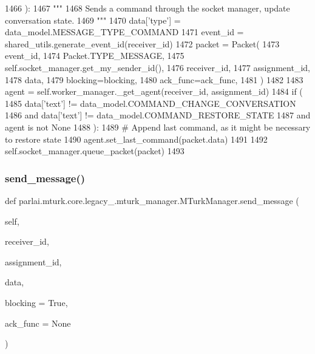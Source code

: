 \begin{DoxyCode}
1466     ):
1467         \textcolor{stringliteral}{"""}
1468 \textcolor{stringliteral}{        Sends a command through the socket manager, update conversation state.}
1469 \textcolor{stringliteral}{        """}
1470         data[\textcolor{stringliteral}{'type'}] = data\_model.MESSAGE\_TYPE\_COMMAND
1471         event\_id = shared\_utils.generate\_event\_id(receiver\_id)
1472         packet = Packet(
1473             event\_id,
1474             Packet.TYPE\_MESSAGE,
1475             self.socket\_manager.get\_my\_sender\_id(),
1476             receiver\_id,
1477             assignment\_id,
1478             data,
1479             blocking=blocking,
1480             ack\_func=ack\_func,
1481         )
1482 
1483         agent = self.worker\_manager.\_get\_agent(receiver\_id, assignment\_id)
1484         \textcolor{keywordflow}{if} (
1485             data[\textcolor{stringliteral}{'text'}] != data\_model.COMMAND\_CHANGE\_CONVERSATION
1486             \textcolor{keywordflow}{and} data[\textcolor{stringliteral}{'text'}] != data\_model.COMMAND\_RESTORE\_STATE
1487             \textcolor{keywordflow}{and} agent \textcolor{keywordflow}{is} \textcolor{keywordflow}{not} \textcolor{keywordtype}{None}
1488         ):
1489             \textcolor{comment}{# Append last command, as it might be necessary to restore state}
1490             agent.set\_last\_command(packet.data)
1491 
1492         self.socket\_manager.queue\_packet(packet)
1493 
\end{DoxyCode}
\mbox{\label{classparlai_1_1mturk_1_1core_1_1legacy__2018_1_1mturk__manager_1_1MTurkManager_a37d88dd1724fcbb3693fbb12d4d04976}} 
\subsubsection{\texorpdfstring{send\+\_\+message()}{send\_message()}}
{\footnotesize\ttfamily def parlai.\+mturk.\+core.\+legacy\+\_.\+mturk\+\_\+manager.\+M\+Turk\+Manager.\+send\+\_\+message (\begin{DoxyParamCaption}\item[{}]{self,  }\item[{}]{receiver\+\_\+id,  }\item[{}]{assignment\+\_\+id,  }\item[{}]{data,  }\item[{}]{blocking = {\ttfamily True},  }\item[{}]{ack\+\_\+func = {\ttfamily None} }\end{DoxyParamCaption})}

